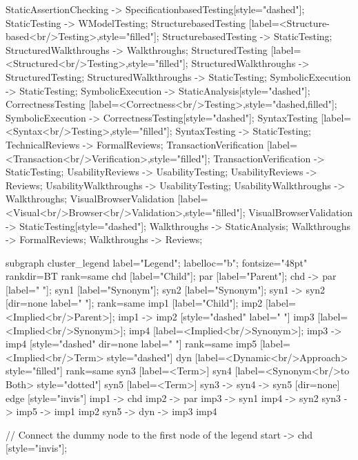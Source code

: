 \documentclass{article}
\begin{document}
{StaticAssertionChecking -> SpecificationbasedTesting[style="dashed"];
StaticTesting -> WModelTesting;
StructurebasedTesting [label=<Structure-based<br/>Testing>,style="filled"];
StructurebasedTesting -> StaticTesting;
StructuredWalkthroughs -> Walkthroughs;
StructuredTesting [label=<Structured<br/>Testing>,style="filled"];
StructuredWalkthroughs -> StructuredTesting;
StructuredWalkthroughs -> StaticTesting;
SymbolicExecution -> StaticTesting;
SymbolicExecution -> StaticAnalysis[style="dashed"];
CorrectnessTesting [label=<Correctness<br/>Testing>,style="dashed,filled"];
SymbolicExecution -> CorrectnessTesting[style="dashed"];
SyntaxTesting [label=<Syntax<br/>Testing>,style="filled"];
SyntaxTesting -> StaticTesting;
TechnicalReviews -> FormalReviews;
TransactionVerification [label=<Transaction<br/>Verification>,style="filled"];
TransactionVerification -> StaticTesting;
UsabilityReviews -> UsabilityTesting;
UsabilityReviews -> Reviews;
UsabilityWalkthroughs -> UsabilityTesting;
UsabilityWalkthroughs -> Walkthroughs;
VisualBrowserValidation [label=<Visual<br/>Browser<br/>Validation>,style="filled"];
VisualBrowserValidation -> StaticTesting[style="dashed"];
Walkthroughs -> StaticAnalysis;
Walkthroughs -> FormalReviews;
Walkthroughs -> Reviews;

subgraph cluster_legend {
    label="Legend";
    labelloc="b";
    fontsize="48pt"
    rankdir=BT
    {
        rank=same
        chd [label="Child"];
        par [label="Parent"];
        chd -> par [label="                "];
        syn1 [label="Synonym"];
        syn2 [label="Synonym"];
        syn1 -> syn2 [dir=none label="                "];
    }
    {
        rank=same
        imp1 [label="Child"];
        imp2 [label=<Implied<br/>Parent>];
        imp1 -> imp2 [style="dashed" label="                "]
        imp3 [label=<Implied<br/>Synonym>];
        imp4 [label=<Implied<br/>Synonym>];
        imp3 -> imp4 [style="dashed" dir=none label="                "]
    }
    {
        rank=same
        imp5 [label=<Implied<br/>Term> style="dashed"]
        dyn [label=<Dynamic<br/>Approach> style="filled"]
    }
    {
        rank=same
        syn3 [label=<Term>]
        syn4 [label=<Synonym<br/>to Both> style="dotted"]
        syn5 [label=<Term>]
        syn3 -> syn4 -> syn5 [dir=none]
    }
    edge [style="invis"]
    imp1 -> chd
    imp2 -> par
    imp3 -> syn1
    imp4 -> syn2
syn3 -> imp5 -> { imp1 imp2 }
syn5 -> dyn -> { imp3 imp4 }
}

// Connect the dummy node to the first node of the legend
start -> chd [style="invis"];
}
\end{document}

